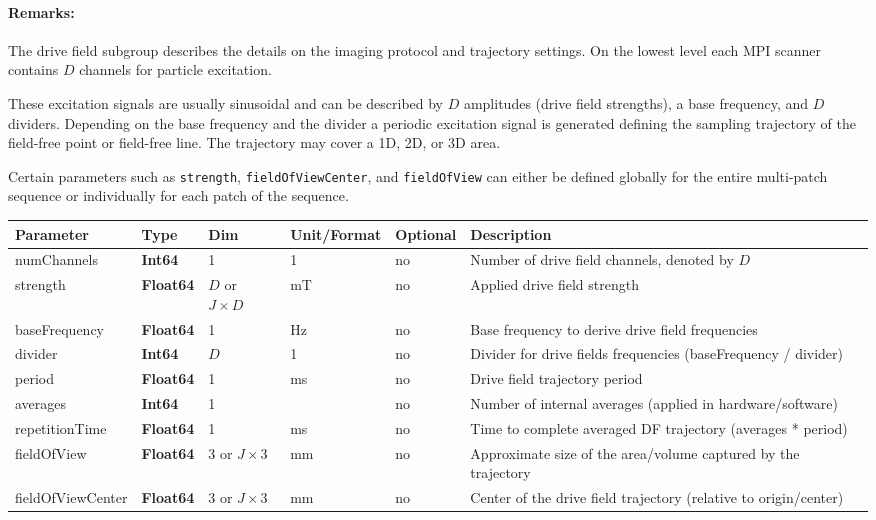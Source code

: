 \documentclass[landscape]{article} %
\newcommand{\inl}[1]{\lstinline[columns=fixed]{#1}}
\newcommand{\inltab}[1]{{\ttfamily\bfseries\color{blue}#1}}
\newcommand{\inlvar}[1]{{\ttfamily#1}}
\begin{document}
\begin{multicols}{2}

\paragraph{Remarks:} The drive field subgroup describes the details on the imaging protocol and trajectory settings. On the lowest level each MPI scanner contains $D$ channels for particle excitation.

These excitation signals are usually sinusoidal and can be described by $D$ amplitudes (drive field strengths), a base frequency, and $D$ dividers. Depending on the base frequency and the divider a periodic excitation signal is generated defining the sampling trajectory of the field-free point or field-free line. The trajectory may cover a 1D, 2D, or 3D area.

Certain parameters such as \inl{strength}, \inl{fieldOfViewCenter}, and \inl{fieldOfView} can either be defined globally for the entire multi-patch sequence or individually for each patch of the sequence.

\end{multicols}


\noindent \begin{tabularx}{\columnwidth}{lllllX} 
\textbf{Parameter} & \textbf{Type} & \textbf{Dim} & \textbf{Unit/Format} & \textbf{Optional} & \textbf{Description} \\ \hline 
\inlvar{numChannels} & \inltab{Int64} & 1 & 1 & no & Number of drive field channels, denoted by $D$ \\ \hline
\inlvar{strength} & \inltab{Float64} & $D$ or $J \times D$ & mT & no & Applied drive field strength \\ \hline
\inlvar{baseFrequency} & \inltab{Float64} & 1 & Hz & no & Base frequency to derive drive field frequencies \\ \hline
\inlvar{divider} & \inltab{Int64} & $D$ & 1 & no & Divider for drive fields frequencies (\inlvar{baseFrequency} / \inlvar{divider}) \\ \hline
\inlvar{period} & \inltab{Float64} & 1 & ms & no & Drive field trajectory period \\ \hline
\inlvar{averages} & \inltab{Int64} & 1 & & no & Number of internal averages (applied in hardware/software) \\ \hline
\inlvar{repetitionTime} & \inltab{Float64} & 1 & ms & no & Time to complete averaged DF trajectory (averages * period)\\ \hline
\inlvar{fieldOfView} & \inltab{Float64} & 3 or $J\times 3$ & mm & no & Approximate size of the area/volume captured by the trajectory \\ \hline
\inlvar{fieldOfViewCenter} & \inltab{Float64} & 3 or $J \times 3$ & mm & no & Center of the drive field trajectory (relative to origin/center) \\ \hline
\end{tabularx}
\end{document}
